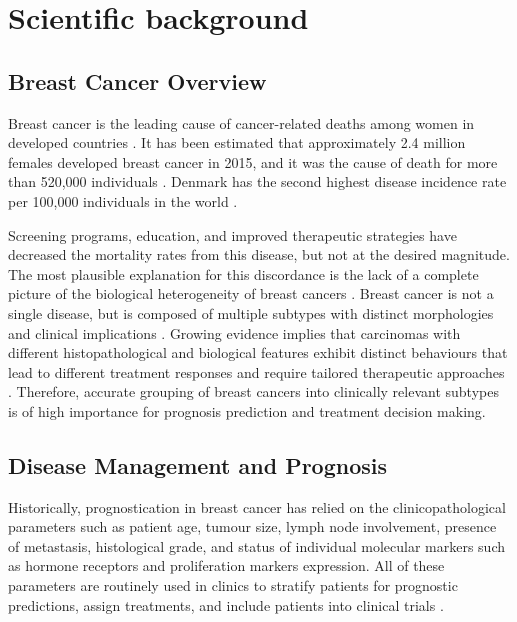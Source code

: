 


\section{Scientific background}

    \subsection{Breast Cancer Overview}
   
    Breast cancer is the leading cause of cancer-related deaths among women in developed countries \cite{ferlay2015cancer}. It has been estimated that approximately 2.4 million females developed breast cancer in 2015, and it was the cause of death for more than 520,000 individuals \cite{Fitzmaurice2017Global2015}.  Denmark has the second highest disease incidence rate per 100,000 individuals in the world \cite{2015BreastInternational}. 
    
    Screening programs, education, and improved therapeutic strategies have decreased the mortality rates from this disease, but not at the desired magnitude. The most plausible explanation for this discordance is the lack of a complete picture of the biological heterogeneity of breast cancers \cite{Vidal2017}.
    Breast cancer is not a single disease, but is composed of multiple subtypes with distinct morphologies and clinical implications \cite{Dai2015}. Growing evidence implies that carcinomas with different histopathological and biological features exhibit distinct behaviours that lead to different treatment responses and require tailored therapeutic approaches \cite{Blows2010}. Therefore, accurate grouping of breast cancers into clinically relevant subtypes is of high importance for prognosis prediction and treatment decision making.

    \subsection{Disease Management and Prognosis}
    
    Historically, prognostication in breast cancer has relied on the clinicopathological parameters such as patient age, tumour size, lymph node involvement, presence of metastasis, histological grade, and status of individual molecular markers such as hormone receptors and proliferation markers expression. All of these parameters are routinely used in clinics to stratify patients for prognostic predictions, assign treatments, and include patients into clinical trials \cite{Vidal2017}.

